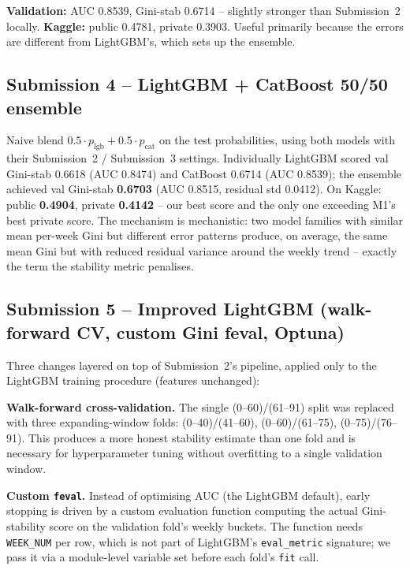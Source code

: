 \documentclass[11pt]{article}
\begin{document}
\textbf{Validation:} AUC 0.8539, Gini-stab 0.6714 -- slightly stronger than Submission~2 locally. \textbf{Kaggle:} public 0.4781, private 0.3903. Useful primarily because the errors are different from LightGBM's, which sets up the ensemble.

\subsection{Submission 4 -- LightGBM + CatBoost 50/50 ensemble}

Naive blend $0.5 \cdot p_{\text{lgb}} + 0.5 \cdot p_{\text{cat}}$ on the test probabilities, using both models with their Submission~2 / Submission~3 settings. Individually LightGBM scored val Gini-stab 0.6618 (AUC 0.8474) and CatBoost 0.6714 (AUC 0.8539); the ensemble achieved val Gini-stab \textbf{0.6703} (AUC 0.8515, residual std 0.0412). On Kaggle: public \textbf{0.4904}, private \textbf{0.4142} -- our best score and the only one exceeding M1's best private score. The mechanism is mechanistic: two model families with similar mean per-week Gini but different error patterns produce, on average, the same mean Gini but with reduced residual variance around the weekly trend -- exactly the term the stability metric penalises.

\subsection{Submission 5 -- Improved LightGBM (walk-forward CV, custom Gini feval, Optuna)}

Three changes layered on top of Submission~2's pipeline, applied only to the LightGBM training procedure (features unchanged):

\textbf{Walk-forward cross-validation.} The single (0--60)/(61--91) split was replaced with three expanding-window folds: (0--40)/(41--60), (0--60)/(61--75), (0--75)/(76--91). This produces a more honest stability estimate than one fold and is necessary for hyperparameter tuning without overfitting to a single validation window.

\textbf{Custom \texttt{feval}.} Instead of optimising AUC (the LightGBM default), early stopping is driven by a custom evaluation function computing the actual Gini-stability score on the validation fold's weekly buckets. The function needs \texttt{WEEK\_NUM} per row, which is not part of LightGBM's \texttt{eval\_metric} signature; we pass it via a module-level variable set before each fold's \texttt{fit} call.
\end{document}
